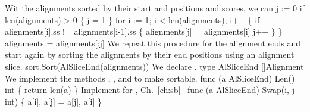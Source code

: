Wit the alignments sorted by their start and positions and scores, we
can 
\nwenddocs{}\endmoddef\nwstartdeflinemarkup{}\nwenddeflinemarkup
j := 0
if len(alignments) > 0 \{ j = 1 \}
for i := 1; i < len(alignments); i++ \{
          if alignments[i].ss != alignments[i-1].ss \{
                  alignments[j] = alignments[i]
                  j++
          \}
\}
alignments = alignments[:j]
\nwendcode{}\nwdocspar
We repeat this procedure for the alignment ends and start again by
sorting the alignments by their end positions using an alignment
slice.
\nwenddocs{}\endmoddef\nwstartdeflinemarkup{}\nwenddeflinemarkup
sort.Sort(AlSliceEnd(alignments))
\nwendcode{}\nwdocspar
We declare .
\nwenddocs{}\plusendmoddef\nwstartdeflinemarkup{}\nwenddeflinemarkup
type AlSliceEnd []Alignment
\nwendcode{}\nwdocspar
We implement the methods , , and  to make
 sortable.
\nwenddocs{}\plusendmoddef\nwstartdeflinemarkup{}\nwenddeflinemarkup
func (a AlSliceEnd) Len() int \{
          return len(a)
\}
\LA{}Implement  for , Ch.~\ref{ch:sb}~{\nwtagstyle{}}\RA{}
func (a AlSliceEnd) Swap(i, j int) \{
          a[i], a[j] = a[j], a[i]
\}
\nwendcode{}\nwdocspar
